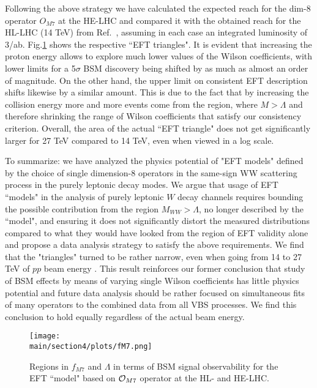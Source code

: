 Following the above strategy we have calculated the expected reach for the dim-8 operator $O_{M7}$ at the HE-LHC and compared it with the obtained reach for the HL-LHC (14 TeV) from Ref.~\cite{Kalinowski:2018oxd}, assuming in each case an integrated luminosity of 3/ab.  Fig.\ref{fig:fM7} shows the respective ``EFT triangles".  It is evident that increasing the proton energy allows to explore much lower values of the Wilson coefficients, with lower limits for a 5$\sigma$ BSM discovery being shifted by as much as almost an order of magnitude.  On the other hand, the upper limit on consistent EFT description shifts likewise by a similar amount. This is due to the fact that by increasing the collision energy more and more events come from the region, where $M>\Lambda$ and therefore shrinking the range of Wilson coefficients that satisfy our consistency criterion.  Overall, the area of the actual ``EFT triangle" does not get significantly larger for 27 TeV compared to 14 TeV, even when viewed in a log scale.  

To summarize:  we have analyzed the physics potential of "EFT models" defined by the choice of single dimension-8 operators in the same-sign WW scattering process in the purely leptonic decay modes.  
We argue that usage of EFT ``models" in the analysis of purely
leptonic $W$ decay channels requires bounding the possible contribution from
the region $M_{WW} > \Lambda$, no longer described by the ``model",
and ensuring it does not significantly distort the measured distributions 
compared to what they would have looked from the region of EFT validity alone and 
propose a data analysis strategy to satisfy the above requirements.  
We find that the "triangles"  turned to be rather narrow, even when going from 14 to 27 TeV of $pp$ beam energy . This result reinforces our former conclusion that study of BSM effects by means of varying single Wilson coefficients has little physics potential and future data analysis should be rather focused on simultaneous fits of many operators to the combined data from all VBS processes.  We find this conclusion to hold equally regardless of the actual beam energy.




\begin{figure}
\centering
\texttt{[image: \\main/section4/plots/fM7.png]}
\caption{
Regions in $f_{M7}$ and $\Lambda$ in terms of BSM signal observability
for the EFT ``model"  based on ${\cal O}_{M7}$ operator at the HL- and HE-LHC.}
\label{fig:fM7}
\end{figure}




%
